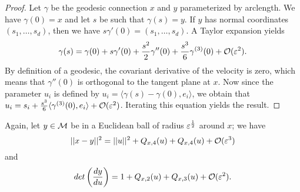 \begin{proof}
Let $\gamma$ be the geodesic connection $x$ and $y$ parameterized by arclength. We have $\gamma(0)=x$ and let $s$ be such that $\gamma(s)=y$. If $y$ has normal coordinates $(s_1,\dots,s_d)$, then we have $s\gamma'(0)=(s_1,\dots,s_d)$. A Taylor expansion yields
\begin{equation*}
\gamma(s)=\gamma(0)+s\gamma'(0)+\frac{s^2}{2}\gamma''(0)+\frac{s^3}{6}\gamma^{(3)}(0)+\mathcal{O}(\varepsilon^2).
\end{equation*}
By definition of a geodesic, the covariant derivative of the velocity is zero, which means that $\gamma''(0)$ is orthogonal to the tangent plane at $x$. Now since the parameter $u_i$ is defined by $u_i=\langle\gamma(s)-\gamma(0),e_i\rangle$, we obtain that $u_i=s_i+\frac{s^3}{6}\langle\gamma^{(3)}(0),e_i\rangle+\mathcal{O}(\varepsilon^2)$. Iterating this equation yields the result.
\end{proof}

\begin{lemma}
Again, let $y\in\mathcal{M}$ be in a Euclidean ball of radius $\varepsilon^\frac{1}{2}$ around $x$; we have
\begin{equation}\label{metricComparison}
||x-y||^2=||u||^2+Q_{x,4}(u)+Q_{x,4}(u)+\mathcal{O}(\varepsilon^3)
\end{equation}
and
\begin{equation}\label{volumeComparison}
det\left(\frac{dy}{du}\right)=1+Q_{x,2}(u)+Q_{x,3}(u)+\mathcal{O}(\varepsilon^2).
\end{equation}
\end{lemma}

